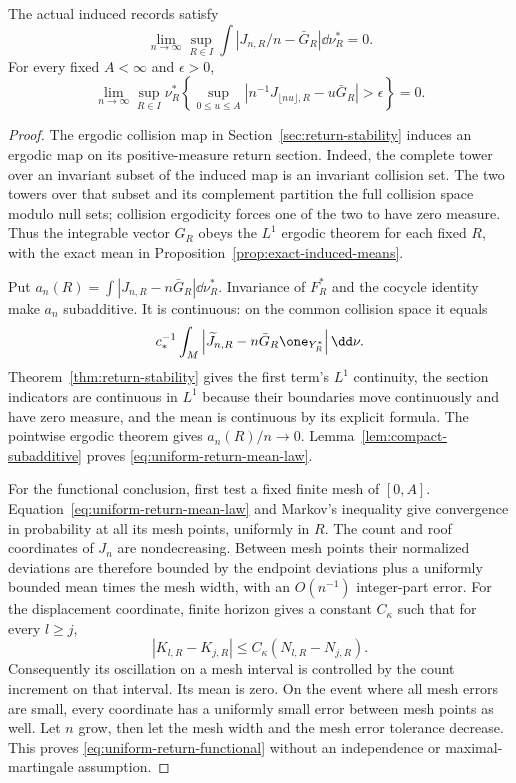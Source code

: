 \begin{theorem}
\label{thm:uniform-return-fluid}
The actual induced records satisfy
\begin{equation}\label{eq:uniform-return-mean-law}
 \lim_{n\to\infty}\sup_{R\in I}
       \int\left|J_{n,R}/n-\bar G_R\right|\dd\nu_R^*=0.
\end{equation}
For every fixed $A<\infty$ and $\epsilon>0$,
\begin{equation}\label{eq:uniform-return-functional}
 \lim_{n\to\infty}\sup_{R\in I}\nu_R^*\left\{
 \sup_{0\le u\le A}
 \left|n^{-1}J_{\lfloor nu\rfloor,R}-u\bar G_R\right|>\epsilon
 \right\}=0.
\end{equation}
\end{theorem}
\begin{proof}
The ergodic collision map in Section~\ref{sec:return-stability}
induces an ergodic map on its positive-measure return section. Indeed,
the complete tower over an invariant subset of the induced map is an
invariant collision set. The two towers over that subset and its
complement partition the full collision space modulo null sets;
collision ergodicity forces one of the two to have zero measure.
Thus the integrable vector $G_R$ obeys the $L^1$ ergodic theorem for
each fixed $R$, with the exact mean in
Proposition~\ref{prop:exact-induced-means}.

Put $a_n(R)=\int|J_{n,R}-n\bar G_R|\dd\nu_R^*$.
Invariance of $F_R^*$ and the cocycle identity make $a_n$ subadditive.
It is continuous: on the common collision space it equals
\[
 c_*^{-1}\int_M
 \left|\widetilde J_{n,R}-n\bar G_R\one_{Y_R^*}\right|\dd\nu.
\]
Theorem~\ref{thm:return-stability} gives the first term's $L^1$
continuity, the section indicators are continuous in $L^1$ because
their boundaries move continuously and have zero measure, and the
mean is continuous by its explicit formula. The pointwise ergodic
theorem gives $a_n(R)/n\to0$. Lemma~\ref{lem:compact-subadditive}
proves \eqref{eq:uniform-return-mean-law}.

For the functional conclusion, first test a fixed finite mesh of
$[0,A]$. Equation~\eqref{eq:uniform-return-mean-law} and Markov's
inequality give convergence in probability at all its mesh points,
uniformly in $R$. The count and roof coordinates of $J_n$ are
nondecreasing. Between mesh points their normalized deviations are
therefore bounded by the endpoint deviations plus a uniformly bounded
mean times the mesh width, with an $O(n^{-1})$ integer-part error.
For the displacement coordinate, finite horizon gives a constant
$C_\kappa$ such that for every $l\ge j$,
\[
 |K_{l,R}-K_{j,R}|\le C_\kappa(N_{l,R}-N_{j,R}).
\]
Consequently its oscillation on a mesh interval is controlled by the
count increment on that interval. Its mean is zero. On the event
where all mesh errors are small, every coordinate has a uniformly
small error between mesh points as well. Let $n$ grow, then let the
mesh width and the mesh error tolerance decrease. This proves
\eqref{eq:uniform-return-functional} without an independence or
maximal-martingale assumption.
\end{proof}

